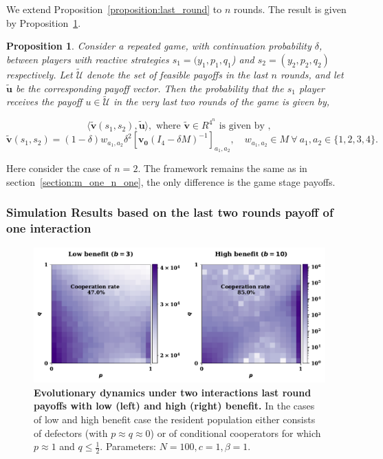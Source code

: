 \documentclass[11pt]{article}
\theoremstyle{plainCl1}
\newtheorem{Prop}{Proposition}
\theoremstyle{plainCl2}
\begin{document}
We extend Proposition~\ref{proposition:last_round} to \(n\) rounds. 
The result is given by Proposition~\ref{proposition:last_two_rounds}.

\begin{Prop}\label{proposition:last_two_rounds} Consider a repeated game, with
  continuation probability $\delta$, between players with reactive strategies
  $s_1\!=\!(y_1, p_1, q_1$)  and $s_2\!=\!(y_2,p_2,q_2)$ respectively. Let
  $\mathcal{\tilde{U}}$ denote the set of feasible payoffs in the last
  \(n\) rounds, and let \(\tilde{\mathbf{u}}\) be the corresponding payoff vector.
  Then the probability that the $s_1$ player receives the payoff $u\!\in\!
  \mathcal{\tilde{U}}$ in the very last two rounds of the game is given by,

  \begin{equation}
  \langle\mathbf{\tilde{v}}(s_1,s_2),\mathbf{\tilde{u}}\rangle, \text{ where } \mathbf{\tilde{v}} \in R^{4^{n}} \text{ is given by },
  \end{equation}
  \begin{equation}
    \mathbf{\tilde{v}}(s_1,s_2) = (1 - \delta) w_{a_1, a_2} \delta^2 \left[\mathbf{v_0}(I_4 - \delta M)^{-1}\right]_{a_1, a_2}, \quad  w_{a_1, a_2} \in M \ \forall \ a_1, a_2 \in \{1, 2, 3, 4\}.
  \end{equation}
\end{Prop}

Here consider the case of \(n=2\). The framework remains the same
as in section~\ref{section:m_one_n_one}, the only difference is the game stage
payoffs.

\subsubsection*{Simulation Results based on the last two rounds payoff of one interaction}

\begin{figure}[!htbp]
  \centering 
  \includegraphics[width=.70\textwidth]{static/two_rounds_donation_game.pdf}
  \caption{\textbf{Evolutionary dynamics under two interactions last round
  payoffs with low (left) and high (right) benefit.} In the cases of low and
  high benefit case the resident population either consists of defectors (with
  \(p \approx q \approx 0\)) or of conditional cooperators for which \(p \approx
  1\) and \(q \leq \frac{1}{2}\). Parameters: \(N =100, c=1, \beta=1\).
  }\label{fig:two_rounds_results}
\end{figure}
\end{document}
